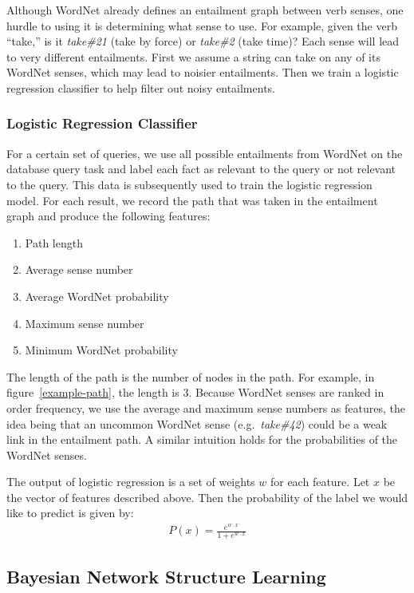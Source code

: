 \documentclass{article}
\begin{document}
Although WordNet already defines an entailment graph between verb senses, one hurdle to using it is determining what sense to use. For example, given the verb ``take,'' is it \textit{take\#21} (take by force) or \textit{take\#2} (take time)? Each sense will lead to very different entailments. First we assume a string can take on any of its WordNet senses, which may lead to noisier entailments. Then we train a logistic regression classifier to help filter out noisy entailments.

\subsubsection{Logistic Regression Classifier}
For a certain set of queries, we use all possible entailments from WordNet on the database query task and label each fact as relevant to the query or not relevant to the query. This data is subsequently used to train the logistic regression model. For each result, we record the path that was taken in the entailment graph and produce the following features:
\begin{enumerate}
  \item Path length
  \item Average sense number
  \item Average WordNet probability
  \item Maximum sense number
  \item Minimum WordNet probability
\end{enumerate}

The length of the path is the number of nodes in the path. For example, in figure~\ref{example-path}, the length is 3. Because WordNet senses are ranked in order frequency, we use the average and maximum sense numbers as features, the idea being that an uncommon WordNet sense (e.g.\ \textit{take\#42}) could be a weak link in the entailment path. A similar intuition holds for the probabilities of the WordNet senses.

The output of logistic regression is a set of weights $w$ for each feature. Let $x$ be the vector of features described above. Then the probability of the label we would like to predict is given by:
\begin{align}
  P(x) = \frac{e^{w\cdot x}}{1 + e^{w\cdot x}}
\end{align} 

\subsection{Bayesian Network Structure Learning}
\end{document}
